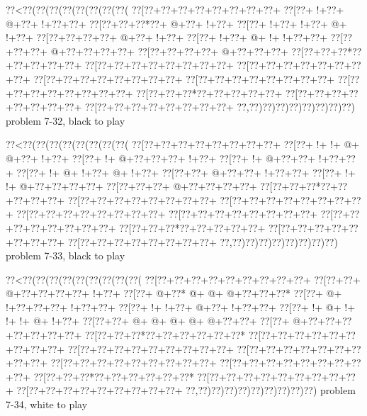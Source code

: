 \vbox{\vbox{\goo
\0??<\0??(\0??(\0??(\0??(\0??(\0??(\0??(\0??(
\0??[\0??+\0??+\0??+\0??+\0??+\0??+\0??+\0??+
\0??[\0??+\- !+\0??+\- @+\0??+\- !+\0??+\0??+
\0??[\0??+\0??+\0??*\0??+\- @+\0??+\- !+\0??+
\0??[\0??+\- !+\0??+\- !+\0??+\- @+\- !+\0??+
\0??[\0??+\0??+\0??+\0??+\- @+\0??+\- !+\0??+
\0??[\0??+\- !+\0??+\- @+\- !+\- !+\0??+\0??+
\0??[\0??+\0??+\0??+\- @+\0??+\0??+\0??+\0??+
\0??[\0??+\0??+\0??+\0??+\- @+\0??+\0??+\0??+
\0??[\0??+\0??+\0??*\0??+\0??+\0??+\0??+\0??+
\0??[\0??+\0??+\0??+\0??+\0??+\0??+\0??+\0??+
\0??[\0??+\0??+\0??+\0??+\0??+\0??+\0??+\0??+
\0??[\0??+\0??+\0??+\0??+\0??+\0??+\0??+\0??+
\0??[\0??+\0??+\0??+\0??+\0??+\0??+\0??+\0??+
\0??[\0??+\0??+\0??+\0??+\0??+\0??+\0??+\0??+
\0??[\0??+\0??+\0??*\0??+\0??+\0??+\0??+\0??+
\0??[\0??+\0??+\0??+\0??+\0??+\0??+\0??+\0??+
\0??[\0??+\0??+\0??+\0??+\0??+\0??+\0??+\0??+
\0??,\0??)\0??)\0??)\0??)\0??)\0??)\0??)\0??)
}
\hfil problem 7-32, black to play\hfil\break
}

\vbox{\vbox{\goo
\0??<\0??(\0??(\0??(\0??(\0??(\0??(\0??(\0??(
\0??[\0??+\0??+\0??+\0??+\0??+\0??+\0??+\0??+
\0??[\0??+\- !+\- !+\- @+\- @+\0??+\- !+\0??+
\0??[\0??+\- !+\- @+\0??+\0??+\0??+\- !+\0??+
\0??[\0??+\- !+\- @+\0??+\0??+\- !+\0??+\0??+
\0??[\0??+\- !+\- @+\- !+\0??+\- @+\- !+\0??+
\0??[\0??+\0??+\- @+\0??+\0??+\- !+\0??+\0??+
\0??[\0??+\- !+\- !+\- @+\0??+\0??+\0??+\0??+
\0??[\0??+\0??+\0??+\- @+\0??+\0??+\0??+\0??+
\0??[\0??+\0??+\0??*\0??+\0??+\0??+\0??+\0??+
\0??[\0??+\0??+\0??+\0??+\0??+\0??+\0??+\0??+
\0??[\0??+\0??+\0??+\0??+\0??+\0??+\0??+\0??+
\0??[\0??+\0??+\0??+\0??+\0??+\0??+\0??+\0??+
\0??[\0??+\0??+\0??+\0??+\0??+\0??+\0??+\0??+
\0??[\0??+\0??+\0??+\0??+\0??+\0??+\0??+\0??+
\0??[\0??+\0??+\0??*\0??+\0??+\0??+\0??+\0??+
\0??[\0??+\0??+\0??+\0??+\0??+\0??+\0??+\0??+
\0??[\0??+\0??+\0??+\0??+\0??+\0??+\0??+\0??+
\0??,\0??)\0??)\0??)\0??)\0??)\0??)\0??)\0??)
}
\hfil problem 7-33, black to play\hfil\break
}

\vbox{\vbox{\goo
\0??<\0??(\0??(\0??(\0??(\0??(\0??(\0??(\0??(\0??(
\0??[\0??+\0??+\0??+\0??+\0??+\0??+\0??+\0??+\0??+
\0??[\0??+\0??+\- @+\0??+\0??+\0??+\0??+\- !+\0??+
\0??[\0??+\- @+\0??*\- @+\- @+\- @+\0??+\0??+\0??*
\0??[\0??+\- @+\- !+\0??+\0??+\0??+\- !+\0??+\0??+
\0??[\0??+\- !+\- !+\0??+\- @+\0??+\- !+\0??+\0??+
\0??[\0??+\- !+\- @+\- !+\- !+\- !+\- @+\- !+\0??+
\0??[\0??+\0??+\- @+\- @+\- @+\- @+\- @+\0??+\0??+
\0??[\0??+\- @+\0??+\0??+\0??+\0??+\0??+\0??+\0??+
\0??[\0??+\0??+\0??*\0??+\0??+\0??+\0??+\0??+\0??*
\0??[\0??+\0??+\0??+\0??+\0??+\0??+\0??+\0??+\0??+
\0??[\0??+\0??+\0??+\0??+\0??+\0??+\0??+\0??+\0??+
\0??[\0??+\0??+\0??+\0??+\0??+\0??+\0??+\0??+\0??+
\0??[\0??+\0??+\0??+\0??+\0??+\0??+\0??+\0??+\0??+
\0??[\0??+\0??+\0??+\0??+\0??+\0??+\0??+\0??+\0??+
\0??[\0??+\0??+\0??*\0??+\0??+\0??+\0??+\0??+\0??*
\0??[\0??+\0??+\0??+\0??+\0??+\0??+\0??+\0??+\0??+
\0??[\0??+\0??+\0??+\0??+\0??+\0??+\0??+\0??+\0??+
\0??,\0??)\0??)\0??)\0??)\0??)\0??)\0??)\0??)\0??)
}
\hfil problem 7-34, white to play\hfil\break
}

